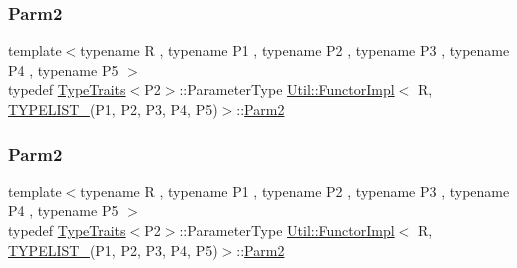 \mbox{\label{classUtil_1_1FunctorImpl_3_01R_00_01TYPELIST__5_07P1_00_01P2_00_01P3_00_01P4_00_01P5_08_4_a9fbaabce4a80f1e7e9eb68fd8ad2a476}} 
\subsubsection{\texorpdfstring{Parm2}{Parm2}\hspace{0.1cm}{\footnotesize\ttfamily [1/2]}}
{\footnotesize\ttfamily template$<$typename R , typename P1 , typename P2 , typename P3 , typename P4 , typename P5 $>$ \\
typedef \mbox{\hyperlink{classUtil_1_1TypeTraits}{Type\+Traits}}$<$P2$>$\+::Parameter\+Type \mbox{\hyperlink{classUtil_1_1FunctorImpl}{Util\+::\+Functor\+Impl}}$<$ R, \mbox{\hyperlink{install_2include_2adat_2typelist_8h_aad5d9b3c82c8503c85c625acd41c0a2f}{T\+Y\+P\+E\+L\+I\+S\+T\+\_}}(P1, P2, P3, P4, P5)$>$\+::\mbox{\hyperlink{structUtil_1_1Private_1_1FunctorImplBase_a554085cd798ef14838a59b528f0feb2e}{Parm2}}}

\mbox{\label{classUtil_1_1FunctorImpl_3_01R_00_01TYPELIST__5_07P1_00_01P2_00_01P3_00_01P4_00_01P5_08_4_a9fbaabce4a80f1e7e9eb68fd8ad2a476}} 
\subsubsection{\texorpdfstring{Parm2}{Parm2}\hspace{0.1cm}{\footnotesize\ttfamily [2/2]}}
{\footnotesize\ttfamily template$<$typename R , typename P1 , typename P2 , typename P3 , typename P4 , typename P5 $>$ \\
typedef \mbox{\hyperlink{classUtil_1_1TypeTraits}{Type\+Traits}}$<$P2$>$\+::Parameter\+Type \mbox{\hyperlink{classUtil_1_1FunctorImpl}{Util\+::\+Functor\+Impl}}$<$ R, \mbox{\hyperlink{install_2include_2adat_2typelist_8h_aad5d9b3c82c8503c85c625acd41c0a2f}{T\+Y\+P\+E\+L\+I\+S\+T\+\_}}(P1, P2, P3, P4, P5)$>$\+::\mbox{\hyperlink{structUtil_1_1Private_1_1FunctorImplBase_a554085cd798ef14838a59b528f0feb2e}{Parm2}}}

